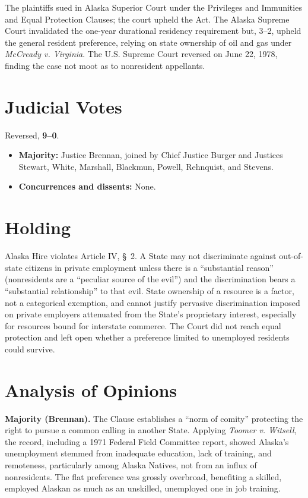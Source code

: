 \documentclass[12pt]{article}
\begin{document}
The plaintiffs sued in Alaska Superior Court under the Privileges and Immunities and Equal Protection Clauses; the court upheld the Act. The Alaska Supreme Court invalidated the one-year durational residency requirement but, 3--2, upheld the general resident preference, relying on state ownership of oil and gas under \textit{McCready v. Virginia}. The U.S. Supreme Court reversed on June 22, 1978, finding the case not moot as to nonresident appellants.

\section{Judicial Votes}

Reversed, \textbf{9--0}.
\begin{itemize}
\item \textbf{Majority:} Justice Brennan, joined by Chief Justice Burger and Justices Stewart, White, Marshall, Blackmun, Powell, Rehnquist, and Stevens.
\item \textbf{Concurrences and dissents:} None.
\end{itemize}

\section{Holding}

Alaska Hire violates Article IV, \S\ 2. A State may not discriminate against out-of-state citizens in private employment unless there is a ``substantial reason'' (nonresidents are a ``peculiar source of the evil'') and the discrimination bears a ``substantial relationship'' to that evil. State ownership of a resource is a factor, not a categorical exemption, and cannot justify pervasive discrimination imposed on private employers attenuated from the State's proprietary interest, especially for resources bound for interstate commerce. The Court did not reach equal protection and left open whether a preference limited to unemployed residents could survive.

\section{Analysis of Opinions}

\textbf{Majority (Brennan).} The Clause establishes a ``norm of comity'' protecting the right to pursue a common calling in another State. Applying \textit{Toomer v. Witsell}, the record, including a 1971 Federal Field Committee report, showed Alaska's unemployment stemmed from inadequate education, lack of training, and remoteness, particularly among Alaska Natives, not from an influx of nonresidents. The flat preference was grossly overbroad, benefiting a skilled, employed Alaskan as much as an unskilled, unemployed one in job training.
\end{document}
